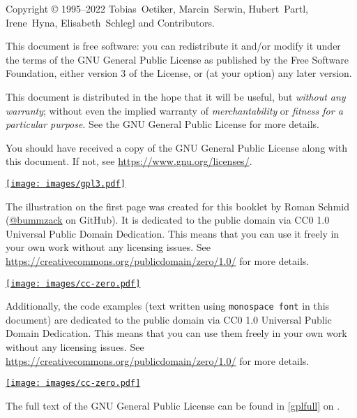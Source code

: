 \begin{small}
  \noindent Copyright \copyright{} 1995--2022 Tobias~Oetiker, Marcin~Serwin,
  Hubert~Partl, Irene~Hyna, Elisabeth~Schlegl and Contributors.

  This document is free software: you can redistribute it and/or modify it under
  the terms of the GNU General Public License as published by the Free Software
  Foundation, either version 3 of the License, or (at your option) any later
  version.

  This document is distributed in the hope that it will be useful, but
  \emph{without any warranty}; without even the implied warranty of
  \emph{merchantability} or \emph{fitness for a particular purpose}.  See
  the GNU General Public License for more details.

  You should have received a copy of the GNU General Public License along with
  this document.  If not, see \url{https://www.gnu.org/licenses/}.
  \vspace{-5pt}
  \begin{flushright}
    \href{https://www.gnu.org/licenses/gpl-3.0.html}{%
      \texttt{[image: images/gpl3.pdf]}}\hspace*{10pt}
  \end{flushright}

  \bigskip\noindent The illustration on the first page was created for this booklet by Roman Schmid
  (\href{https://github.com/bummzack}{@bummzack} on GitHub). It is dedicated to the
  public domain via CC0 1.0 Universal
  Public Domain Dedication. This means that you can use it freely in your own
  work without any licensing issues. See
  \url{https://creativecommons.org/publicdomain/zero/1.0/} for more details.
  \vspace{-15pt}
  \begin{flushright}
    \href{https://creativecommons.org/publicdomain/zero/1.0/}{%
      \texttt{[image: images/cc-zero.pdf]}}\hspace*{10pt}
  \end{flushright}

  \bigskip\noindent
  Additionally, the code examples (text written using \texttt{monospace font}
  in this document) are dedicated to the public domain via CC0 1.0 Universal
  Public Domain Dedication. This means that you can use them freely in your own
  work without any licensing issues. See
  \url{https://creativecommons.org/publicdomain/zero/1.0/} for more details.
  \vspace{-15pt}
  \begin{flushright}
    \href{https://creativecommons.org/publicdomain/zero/1.0/}{%
      \texttt{[image: images/cc-zero.pdf]}}\hspace*{10pt}
  \end{flushright}

  \noindent The full text of the GNU General Public License can be found in
  \autoref{gplfull} on .
\end{small}
\cleardoublepage
